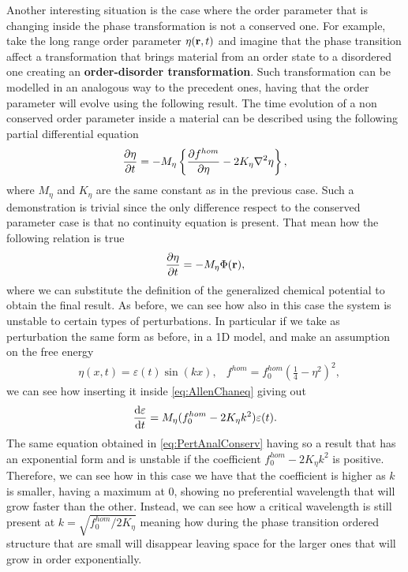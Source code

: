 Another interesting situation is the case where the order parameter that is changing inside the phase transformation is not a conserved one. For example, take the long range order parameter $\eta(\vb{r}, t)$ and imagine that the phase transition affect a transformation that brings material from an order state to a disordered one creating an \textbf{order-disorder transformation}. Such transformation can be modelled in an analogous way to the precedent ones, having that the order parameter will evolve using the following result.
{
    The time evolution of a non conserved order parameter inside a material can be described using the following partial differential equation
    \begin{equation}
        \label{eq:AllenChaneq}
        \pdv{\eta}{t} = -M_\eta \left\{ \pdv{f^{hom}}{\eta} - 2K_\eta \laplacian\eta \right\},
    \end{equation}
    where $M_\eta$ and $K_\eta$ are the same constant as in the previous case.
}
{
    Such a demonstration is trivial since the only difference respect to the conserved parameter case is that no continuity equation is present. That mean how the following relation is true
    \begin{equation}
        \pdv{\eta}{t} = -M_\eta\Phi(\vb{r}),
    \end{equation}
    where we can substitute the definition of the generalized chemical potential to obtain the final result.
}
\noindent 
As before, we can see how also in this case the system is unstable to certain types of perturbations. In particular if we take as perturbation the same form as before, in a 1D model, and make an assumption on the free energy
\begin{align}
    &\eta(x, t) = \varepsilon(t)\sin(kx), &f^{hom} = f_0^{hom}\left( \frac{1}{4} - \eta^2 \right)^2,
\end{align}
we can see how inserting it inside \eqref{eq:AllenChaneq} giving out
\begin{equation}
    \dv{\varepsilon}{t} = M_\eta(f_0^{hom} - 2K_\eta k^2)\varepsilon(t).
\end{equation}
The same equation obtained in \eqref{eq:PertAnalConserv} having so a result that has an exponential form and is unstable if the coefficient $f_0^{hom} - 2K_\eta k^2$ is positive. Therefore, we can see how in this case we have that the coefficient is higher as $k$ is smaller, having a maximum at $0$, showing no preferential wavelength that will grow faster than the other. Instead, we can see how a critical wavelength is still present at $k = \sqrt{f^{hom}_0/ 2K_\eta}$ meaning how during the phase transition ordered structure that are small will disappear leaving space for the larger ones that will grow in order exponentially.